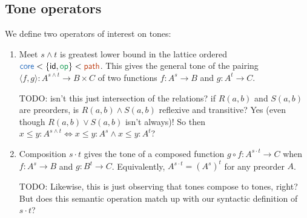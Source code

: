 \documentclass{article}
\newcommand{\todo}[1]{{\color{red}#1}}
\newcommand{\ms}[1]{\ensuremath{\mathsf{#1}}}
\newcommand{\id}{\ms{id}}
\newcommand{\op}{\ms{op}}
\newcommand{\iso}{\ms{core}}
\renewcommand{\path}{\ms{path}}
\newcommand{\tm}{\id}                        %
\newcommand{\ta}{{\color{ForestGreen}\op}}   %
\newcommand{\ti}{{\color{NavyBlue}\iso}}     %
\newcommand{\tb}{{\color{Bittersweet}\path}} %
\newcommand{\tc}{\cdot}         %
\begin{document}

\subsection{Tone operators}

We define two operators of interest on tones:
\begin{enumerate}
\item Meet $s \wedge t$ is greatest lower bound in the lattice ordered $\ti <
  \{\tm, \ta\} < \tb$. This gives the general tone of the pairing $\langle f,
  g\rangle : A^{s \wedge t} \to B \times C$ of two functions $f : A^s \to B$ and
  $g : A^{t} \to C$.

  \todo{TODO: isn't this just intersection of the relations? if $R(a,b)$ and
    $S(a,b)$ are preorders, is $R(a,b) \wedge S(a,b)$ reflexive and transitive?
    Yes (even though $R(a,b) \vee S(a,b)$ isn't always)! So then $x \le y : A^{s
      \wedge t} \iff x \le y : A^s \wedge x \le y : A^t$?}

\item Composition $s \tc t$ gives the tone of a composed function $g \circ f :
  A^{s\tc t} \to C$ when $f : A^s \to B$ and $g : B^t \to C$. Equivalently,
  $A^{s\tc t} = (A^s)^t$ for any preorder $A$.

  \todo{TODO: Likewise, this is just observing that tones compose to tones,
    right? But does this semantic operation match up with our syntactic
    definition of $s \tc t$?}
\end{enumerate}
\end{document}
